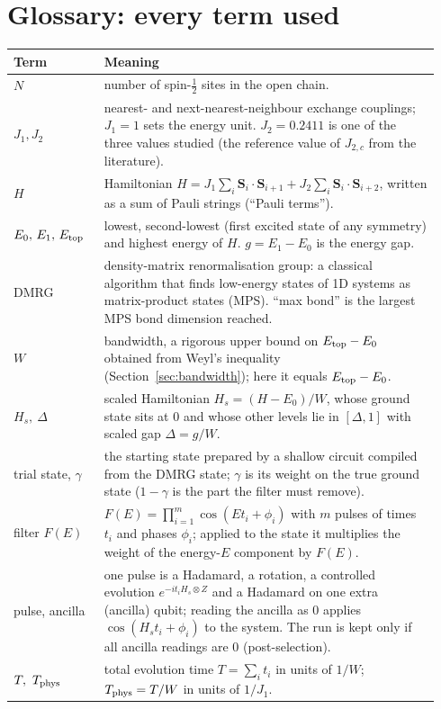\documentclass[11pt]{article}
\begin{document}
\section{Glossary: every term used}\label{sec:glossary}
\begin{longtable}{p{0.2\linewidth}p{0.74\linewidth}}
\toprule
Term & Meaning \\
\midrule
\endhead
$N$ & number of spin-$\tfrac12$ sites in the open chain. \\
$J_1,J_2$ & nearest- and next-nearest-neighbour exchange couplings; $J_1=1$ sets the energy unit. $J_2=0.2411$ is one of the three values studied (the reference value of $J_{2,c}$ from the literature). \\
$H$ & Hamiltonian $H=J_1\sum_i\mathbf S_i\!\cdot\!\mathbf S_{i+1}+J_2\sum_i\mathbf S_i\!\cdot\!\mathbf S_{i+2}$, written as a sum of Pauli strings (``Pauli terms''). \\
$E_0,\,E_1,\,E_{\rm top}$ & lowest, second-lowest (first excited state of any symmetry) and highest energy of $H$. $g=E_1-E_0$ is the energy gap. \\
DMRG & density-matrix renormalisation group: a classical algorithm that finds low-energy states of 1D systems as matrix-product states (MPS). ``max bond'' is the largest MPS bond dimension reached. \\
$W$ & bandwidth, a rigorous upper bound on $E_{\rm top}-E_0$ obtained from Weyl's inequality (Section~\ref{sec:bandwidth}); here it equals $E_{\rm top}-E_0$. \\
$H_s,\ \Delta$ & scaled Hamiltonian $H_s=(H-E_0)/W$, whose ground state sits at $0$ and whose other levels lie in $[\Delta,1]$ with scaled gap $\Delta=g/W$. \\
trial state, $\gamma$ & the starting state prepared by a shallow circuit compiled from the DMRG state; $\gamma$ is its weight on the true ground state ($1-\gamma$ is the part the filter must remove). \\
filter $F(E)$ & $F(E)=\prod_{i=1}^m\cos(Et_i+\phi_i)$ with $m$ pulses of times $t_i$ and phases $\phi_i$; applied to the state it multiplies the weight of the energy-$E$ component by $F(E)$. \\
pulse, ancilla & one pulse is a Hadamard, a rotation, a controlled evolution $e^{-it_iH_s\otimes Z}$ and a Hadamard on one extra (ancilla) qubit; reading the ancilla as $0$ applies $\cos(H_st_i+\phi_i)$ to the system. The run is kept only if all ancilla readings are $0$ (post-selection). \\
$T,\ T_{\rm phys}$ & total evolution time $T=\sum_it_i$ in units of $1/W$; $T_{\rm phys}=T/W$ in units of $1/J_1$. \\

\end{longtable}
\end{document}
